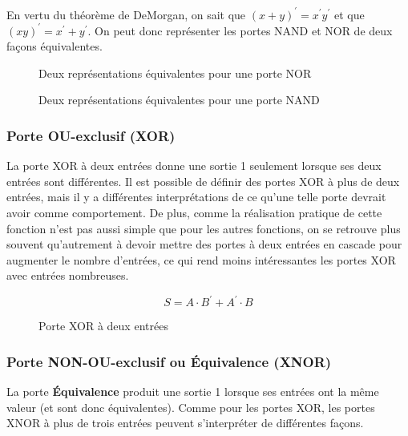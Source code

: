 \documentclass[11pt]{article}
\begin{document}
En vertu du théorème de DeMorgan, on sait que \((x + y)^{\prime} =
x^{\prime} y^{\prime}\) et que \((xy)^{\prime} = x^{\prime} +
y^{\prime}\). On peut donc représenter les portes NAND et NOR de deux
façons équivalentes.

\begin{figure}[htbp]
\centering

\caption{\label{fig:org85990ce}Deux représentations équivalentes pour une porte NOR}
\end{figure}

\begin{figure}[htbp]
\centering

\caption{\label{fig:orge692636}Deux représentations équivalentes pour une porte NAND}
\end{figure}

\subsubsection{Porte OU-exclusif (XOR)}
\label{sec:org66c4993}

La porte XOR à deux entrées donne une sortie 1 seulement lorsque ses
deux entrées sont différentes. Il est possible de définir des portes
XOR à plus de deux entrées, mais il y a différentes interprétations de
ce qu'une telle porte devrait avoir comme comportement. De plus, comme
la réalisation pratique de cette fonction n'est pas aussi simple que
pour les autres fonctions, on se retrouve plus souvent qu'autrement à
devoir mettre des portes à deux entrées en cascade pour augmenter le
nombre d'entrées, ce qui rend moins intéressantes les portes XOR avec
entrées nombreuses.

$$ S= A \cdot B^\prime + A^\prime \cdot B $$  

\begin{figure}[htbp]
\centering

\caption{\label{fig:orgecab42c}Porte XOR à deux entrées}
\end{figure}

\subsubsection{Porte NON-OU-exclusif ou Équivalence (XNOR)}
\label{sec:org425e491}

La porte \textbf{Équivalence} produit une sortie 1 lorsque ses entrées ont la
même valeur (et sont donc équivalentes). Comme pour les portes XOR,
les portes XNOR à plus de trois entrées peuvent s'interpréter de
différentes façons.
\end{document}
